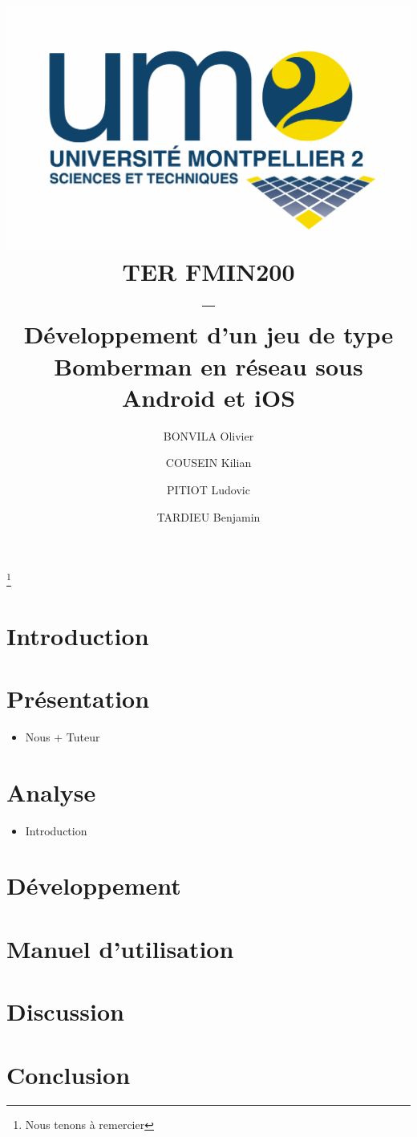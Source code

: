 \documentclass[a4paper,11pt]{report}
\title{
	\includegraphics[scale=.2]{logofds.eps}\\
	\vspace*{1cm}
	TER FMIN200 \\ 
	-- \\
	Développement d'un jeu de type Bomberman en réseau sous Android et iOS
}
\author{BONVILA Olivier \and COUSEIN Kilian \and PITIOT Ludovic \and TARDIEU Benjamin}
\date{}
\begin{document}
\maketitle

\thanks{

  Nous tenons à remercier 

}


\tableofcontents

\chapter{Introduction}

	

\chapter{Présentation}

	\begin{itemize}
		\item{Nous + Tuteur}
	\end{itemize}

	
	
	
\chapter{Analyse}
	\begin{itemize}
		\item{Introduction}
	\end{itemize}
	
	
	


\chapter{Développement}

	

	
		
		
		
		
\chapter{Manuel d'utilisation}

	

	

\chapter{Discussion}

	

	
			
\chapter{Conclusion}

	
\end{document}
